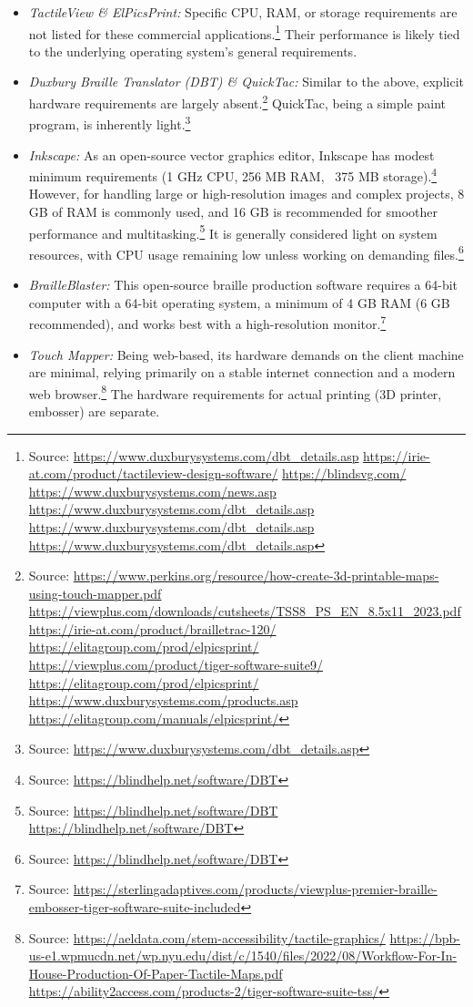 \begin{itemize}
    \item \emph{TactileView \& ElPicsPrint:} Specific CPU, RAM, or storage requirements are not listed for these commercial applications.\footnote{Source:  \url{https://www.duxburysystems.com/dbt_details.asp} \url{https://irie-at.com/product/tactileview-design-software/} \url{https://blindsvg.com/} \url{https://www.duxburysystems.com/news.asp} \url{https://www.duxburysystems.com/dbt_details.asp} \url{https://www.duxburysystems.com/dbt_details.asp} \url{https://www.duxburysystems.com/dbt_details.asp}} Their performance is likely tied to the underlying operating system's general requirements.
    \item \emph{Duxbury Braille Translator (DBT) \& QuickTac:} Similar to the above, explicit hardware requirements are largely absent.\footnote{Source:  \url{https://www.perkins.org/resource/how-create-3d-printable-maps-using-touch-mapper.pdf} \url{https://viewplus.com/downloads/cutsheets/TSS8_PS_EN_8.5x11_2023.pdf} \url{https://irie-at.com/product/brailletrac-120/} \url{https://elitagroup.com/prod/elpicsprint/} \url{https://viewplus.com/product/tiger-software-suite9/} \url{https://elitagroup.com/prod/elpicsprint/} \url{https://www.duxburysystems.com/products.asp} \url{https://elitagroup.com/manuals/elpicsprint/}} QuickTac, being a simple paint program, is inherently light.\footnote{Source:  \url{https://www.duxburysystems.com/dbt_details.asp}}
    \item \emph{Inkscape:} As an open-source vector graphics editor, Inkscape has modest minimum requirements (1 GHz CPU, 256 MB RAM, ~375 MB storage).\footnote{Source:  \url{https://blindhelp.net/software/DBT}} However, for handling large or high-resolution images and complex projects, 8 GB of RAM is commonly used, and 16 GB is recommended for smoother performance and multitasking.\footnote{Source:  \url{https://blindhelp.net/software/DBT} \url{https://blindhelp.net/software/DBT}} It is generally considered light on system resources, with CPU usage remaining low unless working on demanding files.\footnote{Source:  \url{https://blindhelp.net/software/DBT}}
    \item \emph{BrailleBlaster:} This open-source braille production software requires a 64-bit computer with a 64-bit operating system, a minimum of 4 GB RAM (6 GB recommended), and works best with a high-resolution monitor.\footnote{Source:  \url{https://sterlingadaptives.com/products/viewplus-premier-braille-embosser-tiger-software-suite-included}}
    \item \emph{Touch Mapper:} Being web-based, its hardware demands on the client machine are minimal, relying primarily on a stable internet connection and a modern web browser.\footnote{Source:  \url{https://aeldata.com/stem-accessibility/tactile-graphics/} \url{https://bpb-us-e1.wpmucdn.net/wp.nyu.edu/dist/c/1540/files/2022/08/Workflow-For-In-House-Production-Of-Paper-Tactile-Maps.pdf} \url{https://ability2access.com/products-2/tiger-software-suite-tss/}} The hardware requirements for actual printing (3D printer, embosser) are separate.
\end{itemize}

